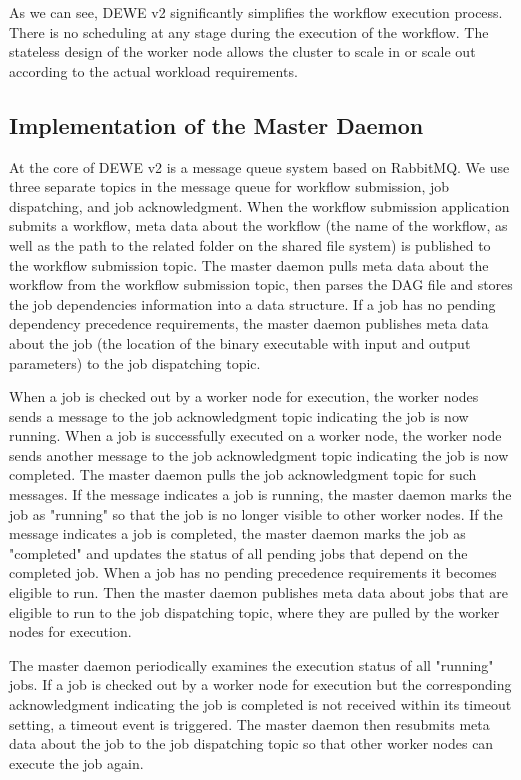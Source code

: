 As we can see, DEWE v2 significantly simplifies the workflow execution process. There is no scheduling at any stage during the execution of the workflow. The stateless design of the worker node allows the cluster to scale in or scale out according to the actual workload requirements. 



\subsection{Implementation of the Master Daemon}
\label{sec:subsec:master_daemon}

At the core of DEWE v2 is a message queue system based on RabbitMQ. We use three separate topics in the message queue for workflow submission, job dispatching, and job acknowledgment. When the workflow submission application submits a workflow, meta data about the workflow (the name of the workflow, as well as the path to the related folder on the shared file system) is published to the workflow submission topic. The master daemon pulls meta data about the workflow from the workflow submission topic, then parses the DAG file and stores the job dependencies information into a data structure. If a job has no pending dependency precedence requirements, the master daemon publishes meta data about the job (the location of the binary executable with input and output parameters) to the job dispatching topic.

When a job is checked out by a worker node for execution, the worker nodes sends a message to the job acknowledgment topic indicating the job is now running. When a job is successfully executed on a worker node, the worker node sends another message to the job acknowledgment topic indicating the job is now completed. The master daemon pulls the job acknowledgment topic for such messages. If the message indicates a job is running, the master daemon marks the job as "running" so that the job is no longer visible to other worker nodes. If the message indicates a job is completed, the master daemon marks the job as "completed" and updates the status of all pending jobs that depend on the completed job. When a job has no pending precedence requirements it becomes eligible to run. Then the master daemon publishes meta data about jobs that are eligible to run to the job dispatching topic, where they are pulled by the worker nodes for execution.

The master daemon periodically examines the execution status of all "running" jobs. If a job is checked out by a worker node for execution but the corresponding acknowledgment indicating the job is completed is not received within its timeout setting, a timeout event is triggered. The master daemon then resubmits meta data about the job to the job dispatching topic so that other worker nodes can execute the job again.


